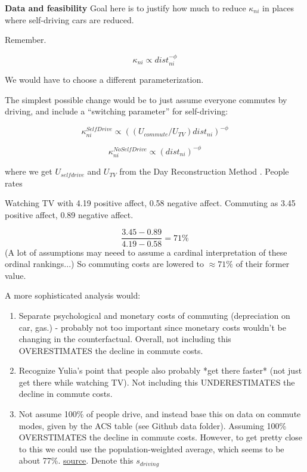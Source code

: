 \documentclass{article}
\begin{document}
\textbf{Data and feasibility}
Goal here is to justify how much to reduce $\kappa_{ni}$ in places where self-driving cars are reduced.

Remember.

$$\kappa_{ni} \propto dist_{ni}^{-\phi}$$

We would have to choose a different parameterization. 

The simplest possible change would be to just assume everyone commutes by driving, and include a ``switching parameter'' for self-driving:



$$\kappa^{SelfDrive}_{ni} \propto ( (U_{commute}/U_{TV} )  dist_{ni} ) ^{-\phi}$$

$$\kappa^{NoSelfDrive}_{ni} \propto ( dist_{ni} ) ^{-\phi}$$

where we get $U_{self drive}$ and $U_{ TV}$ from the Day Reconstruction Method . People rates

Watching TV with 4.19 positive affect, 0.58 negative affect. Commuting as 3.45 positive affect, 0.89 negative affect.

$$\frac{3.45 - 0.89}{ 4.19-0.58} = 71\%$$
(A lot of assumptions may neeed to assume a cardinal interpretation of these ordinal rankings...)
So commuting costs are lowered to  $\approx 71\%$ of their former value.

A more sophisticated analysis would:

\begin{enumerate}
\item Separate psychological and monetary costs of commuting (depreciation on car, gas.) - probably not too important since monetary costs wouldn't be changing in the counterfactual. Overall, not including this OVERESTIMATES the decline in commute costs. 
\item Recognize Yulia's point that people also probably *get there faster* (not just get there while watching TV). Not including this UNDERESTIMATES the decline in commute costs. 
\item Not assume 100\% of people drive, and instead base this on data on commute modes, given by the ACS table (see Github data folder). Assuming 100\% OVERSTIMATES the decline in commute costs. However, to get pretty close to this we could use the population-weighted average, which seems to be about 77\%. \href{https://www2.census.gov/library/publications/2024/demo/acsbr-018.pdf}{source}. Denote this $s_{driving}$
\end{enumerate}
\end{document}
